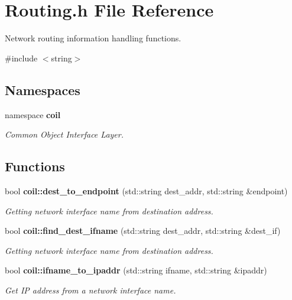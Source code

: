 \section{Routing.h File Reference}
\label{Routing_8h}


Network routing information handling functions.  


{\ttfamily \#include $<$string$>$}\par
\subsection*{Namespaces}
\begin{DoxyCompactItemize}
\item 
namespace {\bf coil}


\begin{DoxyCompactList}\small\item\em Common Object Interface Layer. \item\end{DoxyCompactList}

\end{DoxyCompactItemize}
\subsection*{Functions}
\begin{DoxyCompactItemize}
\item 
bool {\bf coil::dest\_\-to\_\-endpoint} (std::string dest\_\-addr, std::string \&endpoint)
\begin{DoxyCompactList}\small\item\em Getting network interface name from destination address. \item\end{DoxyCompactList}\item 
bool {\bf coil::find\_\-dest\_\-ifname} (std::string dest\_\-addr, std::string \&dest\_\-if)
\begin{DoxyCompactList}\small\item\em Getting network interface name from destination address. \item\end{DoxyCompactList}\item 
bool {\bf coil::ifname\_\-to\_\-ipaddr} (std::string ifname, std::string \&ipaddr)
\begin{DoxyCompactList}\small\item\em Get IP address from a network interface name. \item\end{DoxyCompactList}\end{DoxyCompactItemize}


